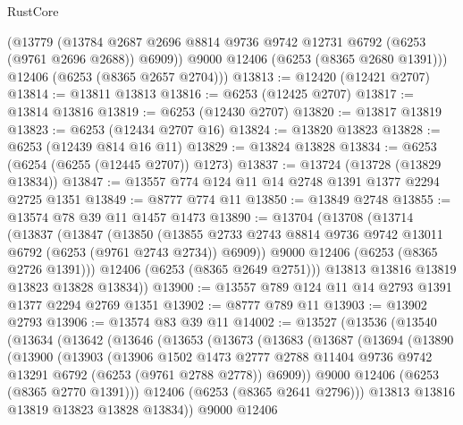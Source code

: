 \begin{lexlean}{RustCore}
\begin{coremodule}
        (@13779
          (@13784 @2687 @2696 @8814 @9736 @9742 @12731 @6792 (@6253 (@9761 @2696 @2688)) @6909))
        @9000
        @12406
        (@6253 (@8365 @2680 @1391)))
      @12406
      (@6253 (@8365 @2657 @2704)))
@13813 := @12420 (@12421 @2707)
@13814 := @13811 @13813
@13816 := @6253 (@12425 @2707)
@13817 := @13814 @13816
@13819 := @6253 (@12430 @2707)
@13820 := @13817 @13819
@13823 := @6253 (@12434 @2707 @16)
@13824 := @13820 @13823
@13828 := @6253 (@12439 @814 @16 @11)
@13829 := @13824 @13828
@13834 := @6253 (@6254 (@6255 (@12445 @2707)) @1273)
@13837 := @13724 (@13728 (@13829 @13834))
@13847 := @13557 @774 @124 @11 @14 @2748 @1391 @1377 @2294 @2725 @1351
@13849 := @8777 @774 @11
@13850 := @13849 @2748
@13855 := @13574 @78 @39 @11 @1457 @1473
@13890 := @13704
    (@13708
      (@13714
        (@13837
          (@13847
            (@13850
              (@13855 @2733 @2743 @8814 @9736 @9742 @13011 @6792 (@6253 (@9761 @2743 @2734)) @6909))
            @9000
            @12406
            (@6253 (@8365 @2726 @1391)))
          @12406
          (@6253 (@8365 @2649 @2751)))
        @13813
        @13816
        @13819
        @13823
        @13828
        @13834))
@13900 := @13557 @789 @124 @11 @14 @2793 @1391 @1377 @2294 @2769 @1351
@13902 := @8777 @789 @11
@13903 := @13902 @2793
@13906 := @13574 @83 @39 @11
@14002 := @13527
    (@13536
      (@13540
        (@13634
          (@13642
            (@13646
              (@13653
                (@13673
                  (@13683
                    (@13687
                      (@13694
                        (@13890
                          (@13900
                            (@13903
                              (@13906
                                @1502
                                @1473
                                @2777
                                @2788
                                @11404
                                @9736
                                @9742
                                @13291
                                @6792
                                (@6253 (@9761 @2788 @2778))
                                @6909))
                            @9000
                            @12406
                            (@6253 (@8365 @2770 @1391)))
                          @12406
                          (@6253 (@8365 @2641 @2796)))
                        @13813
                        @13816
                        @13819
                        @13823
                        @13828
                        @13834))
                    @9000
                    @12406

\end{coremodule}
\end{lexlean}
